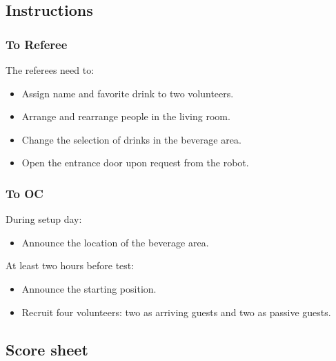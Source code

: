 \subsection*{Instructions}

\subsubsection*{To Referee}

The referees need to:
\begin{itemize}
	\item Assign name and favorite drink to two volunteers.
	\item Arrange and rearrange people in the living room.
	\item Change the selection of drinks in the beverage area.
	\item Open the entrance door upon request from the robot.
\end{itemize}

\subsubsection*{To OC}


During setup day:
\begin{itemize}
	\item Announce the location of the beverage area.
\end{itemize}


At least two hours before test:
\begin{itemize}
	\item Announce the starting position.
	\item Recruit four volunteers: two as arriving guests and two as passive guests.

\end{itemize}

\subsection*{Score sheet}
